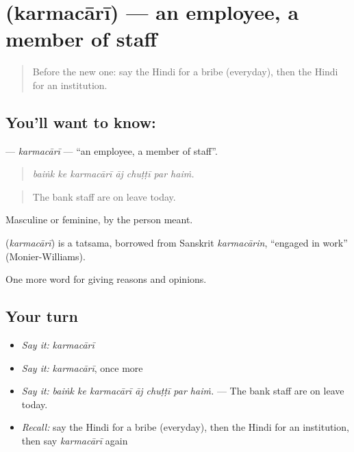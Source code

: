 \section[\texorpdfstring{\hi{कर्मचारी} (karmacārī)}{कर्मचारी (karmacārī)}]{ (karmacārī) — an employee, a member of staff}

\label{lesson:HI-C369-karmacari}



\begin{quote}
Before the new one: say the Hindi for a bribe (everyday), then the Hindi for an institution.
\end{quote}

\subsection*{You'll want to know: }
\textbf{} — \emph{karmacārī} — \textquotedblleft{}an employee, a member of staff\textquotedblright{}.

\begin{quote}
      
\end{quote}

\begin{quote}
\emph{baiṅk ke karmacārī āj chuṭṭī par haiṁ.}
\end{quote}

\begin{quote}
The bank staff are on leave today.
\end{quote}

Masculine or feminine, by the person meant.

\begin{cousinweb}
\textbf{} (\emph{karmacārī}) is a tatsama, borrowed from Sanskrit \emph{karmacārin}, \textquotedblleft{}engaged in work\textquotedblright{} (Monier-Williams).
\end{cousinweb}

\begin{grammarlens}[title={What you've built}]
One more word for giving reasons and opinions.
\end{grammarlens}

\subsection*{Your turn}
\begin{itemize}
\raggedright
  \item \emph{Say it:} \emph{karmacārī}
  \item \emph{Say it:} \emph{karmacārī}, once more
  \item \emph{Say it:} \emph{baiṅk ke karmacārī āj chuṭṭī par haiṁ.} — The bank staff are on leave today.
  \item \emph{Recall:} say the Hindi for a bribe (everyday), then the Hindi for an institution, then say \emph{karmacārī} again
\end{itemize}


